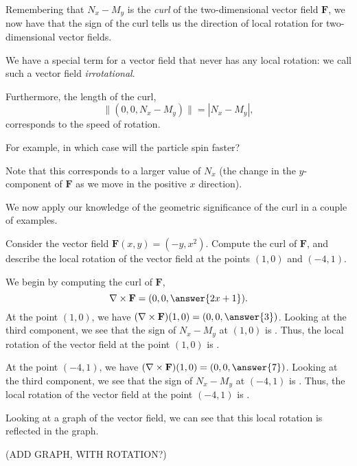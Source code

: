 \documentclass{ximera}
\begin{document}
Remembering that $N_x-M_y$ is the \emph{curl} of the two-dimensional vector field $\mathbf{F}$, we now have that the sign of the curl tells us the direction of local rotation for two-dimensional vector fields.

We have a special term for a vector field that never has any local rotation: we call such a vector field \emph{irrotational}.

Furthermore, the length of the curl,
\[
\|(0,0,N_x-M_y)\|=|N_x-M_y|,
\]
corresponds to the speed of rotation.

For example, in which case will the particle spin faster? 

\begin{multipleChoice}
\end{multipleChoice}

Note that this corresponds to a larger value of $N_x$ (the change in the $y$-component of $\mathbf{F}$ as we move in the positive $x$ direction).

We now apply our knowledge of the geometric significance of the curl in a couple of examples.

\begin{example}
Consider the vector field $\mathbf{F}(x,y)=(-y,x^2)$. Compute the curl of $\mathbf{F}$, and describe the local rotation of the vector field at the points $(1,0)$ and $(-4,1)$.
\begin{explanation}
We begin by computing the curl of $\mathbf{F}$,
\[
\nabla\times\mathbf{F} = (0,0,\answer{2x+1}).
\]
At the point $(1,0)$, we have $(\nabla\times\mathbf{F})(1,0) = (0,0,\answer{3})$. Looking at the third component, we see that the sign of $N_x-M_y$ at $(1,0)$ is . Thus, the local rotation of the vector field at the point $(1,0)$ is .

At the point $(-4,1)$, we have $(\nabla\times\mathbf{F})(1,0) = (0,0,\answer{7})$. Looking at the third component, we see that the sign of $N_x-M_y$ at $(-4,1)$ is . Thus, the local rotation of the vector field at the point $(-4,1)$ is .

Looking at a graph of the vector field, we can see that this local rotation is reflected in the graph.

(ADD GRAPH, WITH ROTATION?)
\end{explanation}
\end{example}
\end{document}
